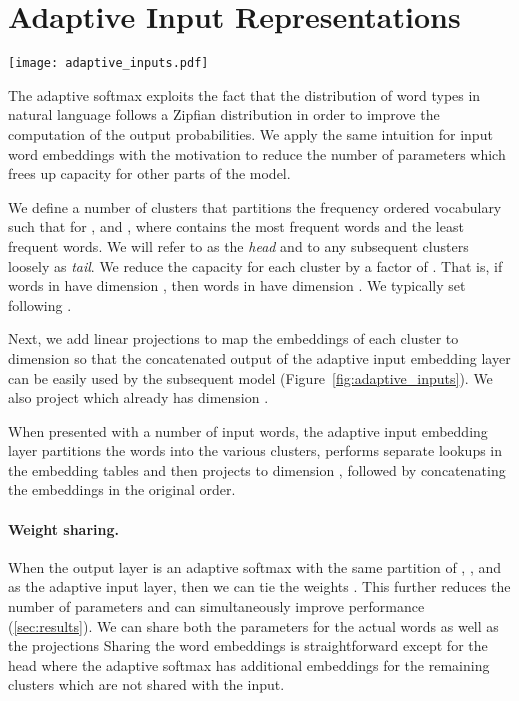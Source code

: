 \documentclass{article} \usepackage{iclr2019_conference,times}
\begin{document}
\section{Adaptive Input Representations}

\begin{figure*}
\centering
\texttt{[image: adaptive\_inputs.pdf]}
\caption{Illustration of adaptive input representations. Words are assigned to clusters  based on their frequency which determines the size of the representations. Embeddings are projected to a common dimension  before being fed to the model.
}
\label{fig:adaptive_inputs}
\end{figure*}

The adaptive softmax exploits the fact that the distribution of word types in natural language follows a Zipfian distribution in order to improve the computation of the output probabilities.
We apply the same intuition for input word embeddings with the motivation to reduce the number of parameters which frees up capacity for other parts of the model.

We define a number of clusters that partitions the frequency ordered vocabulary  such that  for , and , where  contains the most frequent words and  the least frequent words.
We will refer to  as the \emph{head} and to any subsequent clusters loosely as \emph{tail}.
We reduce the capacity for each cluster by a factor of . 
That is, if words in  have dimension , then words in  have dimension . 
We typically set  following \citet{grave2017icml}.

Next, we add linear projections  to map the embeddings of each cluster to dimension  so that the concatenated output of the adaptive input embedding layer can be easily used by the subsequent model (Figure~\ref{fig:adaptive_inputs}).
We also project  which already has dimension .

When presented with a number of input words, the adaptive input embedding layer partitions the words into the various clusters, performs separate lookups in the embedding tables and then projects to dimension , followed by concatenating the embeddings in the original order.


\paragraph{Weight sharing.}
When the output layer is an adaptive softmax with the same partition of , , and  as the adaptive input layer, then we can tie the weights \citep{inan2016tying,press2016using}.
This further reduces the number of parameters and can simultaneously improve performance (\textsection\ref{sec:results}).
We can share both the parameters for the actual words as well as the projections 
Sharing the word embeddings is straightforward except for the head where the adaptive softmax has  additional embeddings for the remaining clusters which are not shared with the input.
\end{document}
